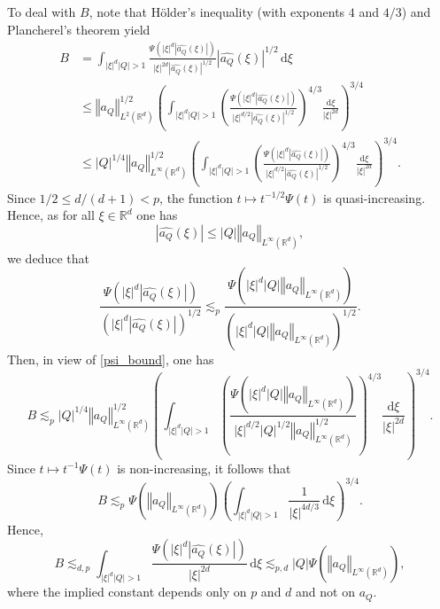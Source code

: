 \documentclass[a4paper, leqno, 10pt]{amsart}
\numberwithin{equation}{section}
\newcommand{\dd}{\mathrm{d}}
\newcommand{\R}{\mathbb{R}}
\newcommand{\norm}[1]{\left\Vert#1\right\Vert}
\newcommand{\brkt}[1]{\left(#1\right)}
\newcommand{\abs}[1]{\left|#1\right|}
\begin{document}
To deal with $B$, note that  
H\"older's inequality (with exponents $4$ and $4/3$) and Plancherel's theorem yield
\begin{align*}
B &=\int_{\abs{\xi}^{d}\abs{Q} > 1} \frac{\Psi\brkt{\abs{\xi}^d\abs{\widehat{a_Q}(\xi)}}}{\abs{\xi}^{2d}{\abs{\widehat{a_Q}(\xi)}^{1/2}}} \abs{\widehat{a_Q}(\xi)}^{1/2} \, \dd \xi \\ 
&\leq \norm{a_Q}_{L^2 (\R^d)}^{1/2} \brkt{\int_{\abs{\xi}^{d}\abs{Q} > 1} \brkt{ \frac{\Psi\brkt{\abs{\xi}^d\abs{\widehat{a_Q}(\xi)}}}{  \abs{\xi}^{d/2} \abs{ \widehat{a_Q}(\xi)}^{1/2}}}^{4/3} \frac{\dd \xi}{\abs{\xi}^{2d}}}^{3/4} \\
&\leq \abs{Q}^{1/4} \norm{a_Q}_{L^{\infty} (\R^d)}^{1/2} \brkt{\int_{\abs{\xi}^{d}\abs{Q} > 1} \brkt{ \frac{\Psi\brkt{\abs{\xi}^d\abs{\widehat{a_Q}(\xi)}}}{\abs{\xi}^{d/2} \abs{ \widehat{a_Q}(\xi)}^{1/2}}}^{4/3} \frac{\dd \xi}{\abs{\xi}^{2d}} }^{3/4} .
\end{align*}
Since $1/2 \leq d/ (d+1) < p$, the function $t \mapsto t^{-1/2} \Psi(t)$ is quasi-increasing. Hence, as for all $\xi\in \R^d$ one has
\[
\abs{\widehat{a_Q} (\xi)}\leq \abs{Q} \norm{a_Q}_{L^{\infty} (\R^d)} , 
\]
we deduce that 
\begin{equation}\label{psi_bound}
\frac{\Psi\brkt{\abs{\xi}^d\abs{\widehat{a_Q}(\xi)}}}{ \brkt{ \abs{\xi}^d \abs{\widehat{a_Q}(\xi)} }^{1/2}} \lesssim_p \frac{\Psi \brkt{ \abs{\xi}^d \abs{Q} \norm{a_Q}_{L^{\infty} (\R^d)} } }{\brkt{ \abs{\xi}^d \abs{Q}  \norm{a_Q}_{L^{\infty} (\R^d)} }^{1/2}} .
\end{equation}
Then, in view of \eqref{psi_bound}, one has 
\[
B \lesssim_p \abs{Q}^{1/4} \norm{a_Q}_{L^{\infty} (\R^d)}^{1/2} \brkt{\int_{\abs{\xi}^{d}\abs{Q} > 1} \brkt{ \frac{\Psi\brkt{\abs{\xi}^d \abs{Q} \norm{a_Q }_{L^{\infty} (\R^d)} }}{\abs{\xi}^{d/2} \abs{Q}^{1/2} \norm{ a_Q }_{L^{\infty}(\R^d)}^{1/2}}}^{4/3} \frac{\dd \xi}{\abs{\xi}^{2d}} }^{3/4} .
\]
Since $ t \mapsto t^{-1 } \Psi (t) $ is non-increasing, it follows that  
\[
B \lesssim_p  \Psi \brkt{ \norm{a_Q}_{L^{\infty} (\R^d)}} \brkt{    \int_{\abs{\xi}^{d}\abs{Q} > 1}   \frac{ 1 } { \abs{\xi}^{4d/3} } \, \dd \xi }^{3/4}. 
\]
Hence,
\begin{equation}\label{B}
B \lesssim_{d,p} \int_{\abs{\xi}^{d}\abs{Q} >  1} \frac{\Psi \brkt{\abs{\xi}^d\abs{\widehat{a_Q}(\xi)}}}{\abs{\xi}^{2d}} \, \dd \xi \lesssim_{p,d} {\abs{Q}} \Psi \brkt{ \norm{a_Q}_{L^{\infty} (\R^d)}},
\end{equation}
where the implied constant depends only on $p$ and $d$ and not on $a_Q$. 
\end{document}
